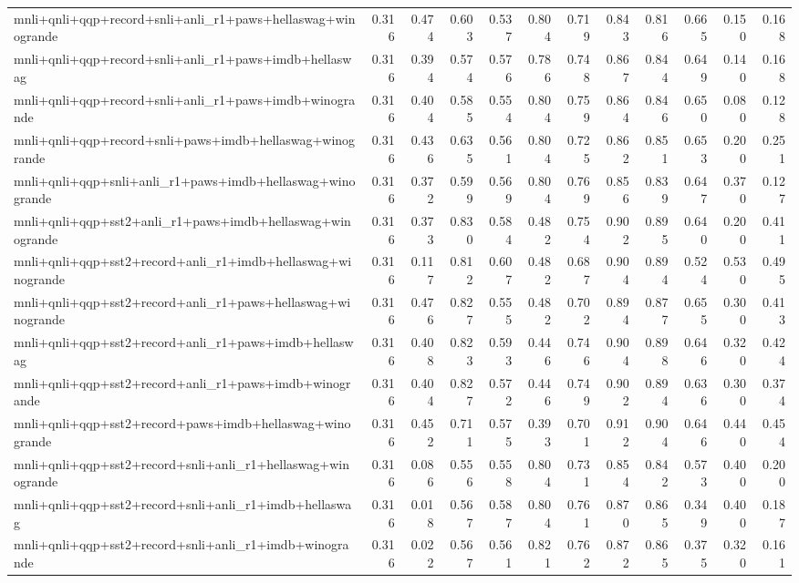 \begin{table}[t]
\begin{tabular}{lrrrrrrrrrrr}
    mnli+qnli+qqp+record+snli+anli\_r1+paws+hellaswag+winogrande & 0.316 & 0.474 & 0.603 & 0.537 & 0.804 & 0.719 & 0.843 & 0.816 & 0.665 & 0.150 & 0.168 \\
    mnli+qnli+qqp+record+snli+anli\_r1+paws+imdb+hellaswag & 0.316 & 0.394 & 0.574 & 0.576 & 0.786 & 0.748 & 0.867 & 0.844 & 0.649 & 0.140 & 0.168 \\
    mnli+qnli+qqp+record+snli+anli\_r1+paws+imdb+winogrande & 0.316 & 0.404 & 0.585 & 0.554 & 0.804 & 0.759 & 0.864 & 0.846 & 0.650 & 0.080 & 0.128 \\
    mnli+qnli+qqp+record+snli+paws+imdb+hellaswag+winogrande & 0.316 & 0.436 & 0.635 & 0.561 & 0.804 & 0.725 & 0.862 & 0.851 & 0.653 & 0.200 & 0.251 \\
    mnli+qnli+qqp+snli+anli\_r1+paws+imdb+hellaswag+winogrande & 0.316 & 0.372 & 0.599 & 0.569 & 0.804 & 0.769 & 0.856 & 0.839 & 0.647 & 0.370 & 0.127 \\
    mnli+qnli+qqp+sst2+anli\_r1+paws+imdb+hellaswag+winogrande & 0.316 & 0.373 & 0.830 & 0.584 & 0.482 & 0.754 & 0.902 & 0.895 & 0.640 & 0.200 & 0.411 \\
    mnli+qnli+qqp+sst2+record+anli\_r1+imdb+hellaswag+winogrande & 0.316 & 0.117 & 0.812 & 0.607 & 0.482 & 0.687 & 0.904 & 0.894 & 0.524 & 0.530 & 0.495 \\
    mnli+qnli+qqp+sst2+record+anli\_r1+paws+hellaswag+winogrande & 0.316 & 0.476 & 0.827 & 0.555 & 0.482 & 0.702 & 0.894 & 0.877 & 0.655 & 0.300 & 0.413 \\
    mnli+qnli+qqp+sst2+record+anli\_r1+paws+imdb+hellaswag & 0.316 & 0.408 & 0.823 & 0.593 & 0.446 & 0.746 & 0.904 & 0.898 & 0.646 & 0.320 & 0.424 \\
    mnli+qnli+qqp+sst2+record+anli\_r1+paws+imdb+winogrande & 0.316 & 0.404 & 0.827 & 0.572 & 0.446 & 0.749 & 0.902 & 0.894 & 0.636 & 0.300 & 0.374 \\
    mnli+qnli+qqp+sst2+record+paws+imdb+hellaswag+winogrande & 0.316 & 0.452 & 0.711 & 0.575 & 0.393 & 0.701 & 0.912 & 0.904 & 0.646 & 0.440 & 0.454 \\
    mnli+qnli+qqp+sst2+record+snli+anli\_r1+hellaswag+winogrande & 0.316 & 0.086 & 0.556 & 0.558 & 0.804 & 0.731 & 0.854 & 0.842 & 0.573 & 0.400 & 0.200 \\
    mnli+qnli+qqp+sst2+record+snli+anli\_r1+imdb+hellaswag & 0.316 & 0.018 & 0.567 & 0.587 & 0.804 & 0.761 & 0.870 & 0.865 & 0.349 & 0.400 & 0.187 \\
    mnli+qnli+qqp+sst2+record+snli+anli\_r1+imdb+winogrande & 0.316 & 0.022 & 0.567 & 0.561 & 0.821 & 0.762 & 0.872 & 0.865 & 0.375 & 0.320 & 0.161 \\

\end{tabular}
\end{table}
